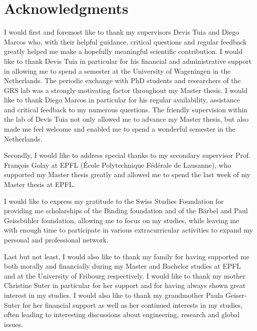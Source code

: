 \documentclass[10pt]{article}
\begin{document}
\thispagestyle{empty}
\section*{Acknowledgments}
I would first and foremost like to thank my supervisors Devis Tuia and Diego Marcos who, with their helpful guidance, critical questions and regular feedback greatly helped me make a hopefully meaningful scientific contribution. I would like to thank Devis Tuia in particular for his financial and administrative support in allowing me to spend a semester at the University of Wageningen in the Netherlands. The periodic exchange with PhD students and researchers of the GRS lab was a strongly motivating factor throughout my Master thesis. I would like to thank Diego Marcos in particular for his regular availability, assistance and critical feedback to my numerous questions. The friendly supervision within the lab of Devis Tuia not only allowed me to advance my Master thesis, but also made me feel welcome and enabled me to spend a wonderful semester in the Netherlands.

Secondly, I would like to address special thanks to my secondary supervisor Prof. François Golay at EPFL (École Polytechnique Fédérale de Lausanne), who supported my Master thesis greatly and allowed me to spend the last week of my Master thesis at EPFL.

I would like to express my gratitude to the Swiss Studies Foundation for providing me scholarships of the Binding foundation and of the Bärbel and Paul Geissbühler foundation, allowing me to focus on my studies, while leaving me with enough time to participate in various extracurricular activities to expand my personal and professional network.

Last but not least, I would also like to thank my family for having supported me both morally and financially during my Master and Bachelor studies at EPFL and at the University of Fribourg respectively. I would like to thank my mother Christine Suter in particular for her support and for having always shown great interest in my studies. I would also like to thank my grandmother Paula Geiser-Suter for her financial support as well as her continued interests in my studies, often leading to interesting discussions about engineering, research and global issues.

\newpage
{}
\tableofcontents
{}
\listoffigures
{}
\listoftables
\clearpage
\printglossaries
\clearpage
\end{document}
